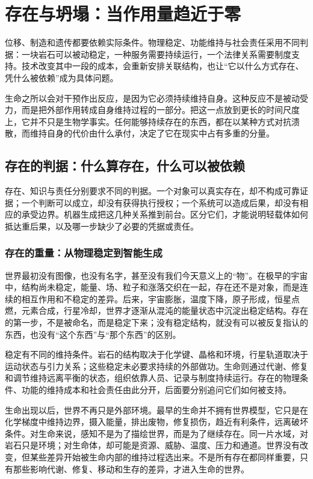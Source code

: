 \chapter{存在与坍塌：当作用量趋近于零}

位移、制造和遗传都要依赖实际条件。物理稳定、功能维持与社会责任采用不同判据：一块岩石可以被动稳定，一种服务需要持续运行，一个法律关系需要制度支持。技术改变其中一段的成本，会重新安排关联结构，也让“它以什么方式存在、凭什么被依赖”成为具体问题。

生命之所以会对干预作出反应，是因为它必须持续维持自身。这种反应不是被动受力，而是把外部作用转成自身维持过程的一部分。把这一点放到更长的时间尺度上，它并不只是生物学事实。任何能够持续存在的东西，都在以某种方式对抗溃散，而维持自身的代价由什么承付，决定了它在现实中占有多重的分量。

\section{存在的判据：什么算存在，什么可以被依赖}

存在、知识与责任分别要求不同的判据。一个对象可以真实存在，却不构成可靠证据；一个判断可以成立，却没有获得执行授权；一个系统可以造成后果，却没有相应的承受边界。机器生成把这几种关系推到前台。区分它们，才能说明轻载体如何抵达重后果，以及哪一步缺少了必要的凭据或责任。

\subsection{存在的重量：从物理稳定到智能生成}


世界最初没有图像，也没有名字，甚至没有我们今天意义上的“物”。在极早的宇宙中，结构尚未稳定，能量、场、粒子和涨落交织在一起，存在还不是对象，而是连续的相互作用和不稳定的差异。后来，宇宙膨胀，温度下降，原子形成，恒星点燃，元素合成，行星冷却，世界才逐渐从混沌的能量状态中沉淀出稳定结构。存在的第一步，不是被命名，而是稳定下来；没有稳定结构，就没有可以被反复指认的东西，也没有“这个东西”与“那个东西”的区别。

稳定有不同的维持条件。岩石的结构取决于化学键、晶格和环境，行星轨道取决于运动状态与引力关系；这些稳定未必要求持续的外部做功。生命则通过代谢、修复和调节维持远离平衡的状态，组织依靠人员、记录与制度持续运行。存在的物理条件、功能的维持成本和社会责任由此分开，后面要分别追问它们如何被支持。

生命出现以后，世界不再只是外部环境。最早的生命并不拥有世界模型，它只是在化学梯度中维持边界，摄入能量，排出废物，修复损伤，趋近有利条件，远离破坏条件。对生命来说，感知不是为了描绘世界，而是为了继续存在。同一片水域，对岩石只是环境；对生命体，却可能是资源、威胁、温度、压力和通道。世界没有改变，但某些差异开始被生命内部的维持过程选出来。不是所有存在都同样重要，只有那些影响代谢、修复、移动和生存的差异，才进入生命的世界。

